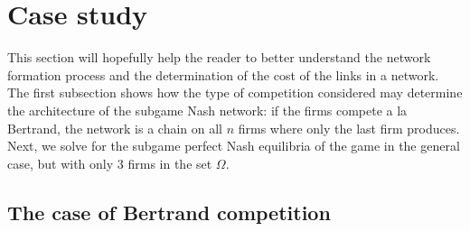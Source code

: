 \documentclass{article}
\begin{document}
\section{Case study}
This section will hopefully help the reader to better understand the network formation process and the determination of the cost of the links in a network. The first subsection shows how the type of competition considered may determine the architecture of the subgame Nash network: if the firms compete a la Bertrand, the network is a chain on all $n$ firms where only the last firm produces. Next, we solve for the subgame perfect Nash equilibria of the game in the general case, but with only 3 firms in the set $\Omega$.
    
\subsection{The case of Bertrand competition}




\end{document}
